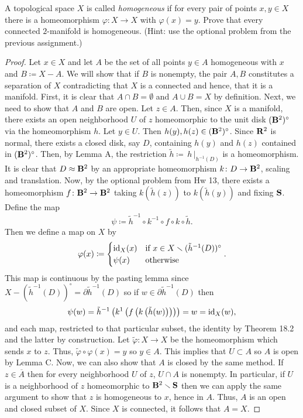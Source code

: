 \newpage
\begin{problem}[B]
A topological space $X$ is called \emph{homogeneous} if for every pair of
points $x,y\in X$ there is a homeomorphism $\varphi\colon X\to X$ with
$\varphi(x)=y$. Prove that every connected $2$-manifold is
homogeneous. (Hint: use the optional problem from the previous assignment.)
\end{problem}
\begin{proof}
Let $x\in X$ and let $A$ be the set of all points $y\in A$ homogeneous with
$x$ and $B\coloneqq X\minus A$. We will show that if $B$ is nonempty, the
pair $A,B$ constitutes a separation of $X$ contradicting that $X$ is a
connected and hence, that it is a manifold. First, it is clear that $A\cap
B=\emptyset$ and $A\cup B=X$ by definition. Next, we need to show that $A$
and $B$ are open. Let $z\in A$. Then, since $X$ is a manifold, there exists
an open neighborhood $U$ of $z$ homeomorphic to the unit disk
$(\mathbf{B}^2)^\circ$ via the homeomorphism $h$. Let $y\in U$. Then
$h(y),h(z)\in (\mathbf{B}^2)^\circ$. Since $\mathbf{R}^2$ is normal, there exists a
closed disk, say $D$, containing $h(y)$ and $h(z)$ contained in
$(\mathbf{B}^2)^\circ$. Then, by Lemma A, the restriction $\tilde
h\coloneqq\left.\,h\,\right|_{h^{-1}(D)}$ is a homeomorphism. It is clear
that $D\approx\mathbf{B}^2$ by an appropriate homeomorphism $k\colon D\to\mathbf{B}^2$,
scaling and translation. Now, by the optional problem from Hw 13, there
exists a homeomorphism $f\colon\mathbf{B}^2\to\mathbf{B}^2$ taking $k(\tilde h(z))$ to
$k(\tilde h(y))$ and fixing $\mathbf{S}$. Define the map
\begin{equation}
\label{eq:7}
\psi\coloneqq\tilde h^{-1}\circ k^{-1}\circ f\circ k\circ\tilde h.
\end{equation}
Then we define a map on $X$ by
\begin{equation}
\label{eq:8}
\varphi(x)\coloneqq
\begin{cases}
\operatorname{id}_X(x)&\text{if $x\in X\smallsetminus(\tilde h^{-1}(D))^\circ$}\\
\psi(x)&\text{otherwise}
\end{cases}.
\end{equation}
This map is continuous by the pasting lemma since $X\minus(\tilde
h^{-1}(D))^\circ=\partial\tilde h^{-1}(D)$ so if $w\in\partial\tilde
h^{-1}(D)$ then
\[
\psi(w)=\tilde h^{-1}\left(k^{1}\left(f\left(k\left(\tilde h(w)\right)\right)\right)\right)=w=\operatorname{id}_X(w),
\]
and each map, restricted to that particular subset, the identity by Theorem
18.2 and the latter by construction. Let $\tilde\varphi\colon X\to X$ be
the homeomorphism which sends $x$ to $z$. Thus,
$\tilde\varphi\circ\varphi(x)=y$ so $y\in A$. This implies that $U\subset
A$ so $A$ is open by Lemma C. Now, we can also show that $A$ is closed by
the same method. If $z\in\overline{A}$ then for every neighborhood $U$ of
$z$, $U\cap A$ is nonempty. In particular, if $U$ is a neighborhood of
$z$ homeomorphic to $\mathbf{B}^2\smallsetminus\mathbf{S}$ then we can apply the same argument
to show that $z$ is homogeneous to $x$, hence in $A$. Thus, $A$ is an open
and closed subset of $X$. Since $X$ is connected, it follows that $A=X$.
\end{proof}
